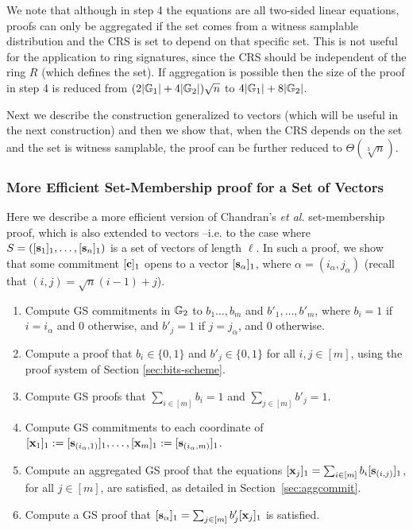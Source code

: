 We note that although in step 4 the equations are all two-sided linear equations, proofs can only be aggregated if the set comes from a witness samplable distribution and the CRS is set to depend on that specific set. 
This is not useful for the application 
to ring signatures, since the CRS should be independent of the ring $R$ (which defines the set). If aggregation is possible then the size of the proof in step 4 is reduced from $(2|\mathbb{G}_1|+4|\mathbb{G}_2|)\sqrt{n}$ to $4|\mathbb{G}_1|+8|\mathbb{G}_2|$.

Next we describe the construction generalized to vectors (which will be useful in the next construction) and then we show that,
when the CRS depends on the set and the set is witness samplable, the proof can be further reduced to $\Theta(\sqrt[3]{n})$.

\subsubsection{More Efficient Set-Membership proof for a Set of Vectors}  
Here we describe a more efficient version of Chandran's \textit{et al.} set-membership proof,  
which is also extended to vectors --i.e. to the case where $S=([\mathbf{s}_1]_1,\ldots,[\mathbf{s}_n]_1)$ is a set of vectors of length $\ell$. In such a proof, we show that some commitment $[\mathbf{c}]_1$ opens to a vector $[\mathbf{s}_{\alpha}]_1$, where $\alpha=(i_\alpha,j_\alpha)$ (recall that $(i,j)=\sqrt{n}(i-1)+j$).

\begin{enumerate}
\item Compute GS commitments in $\mathbb{G}_2$ to $b_1\ldots,b_m$ and $b'_1,\ldots,b'_m$,
      where $b_i = 1$ if $i=i_\alpha$ and $0$ otherwise, and $b'_{j}=1$ if $j=j_\alpha$, and $0$ otherwise.
\item Compute a proof that $b_i \in \{0,1\}$ and $b'_j \in \{0,1\}$ for all $i,j\in[m]$, using the proof system of Section \ref{sec:bits-scheme}.
\item Compute GS proofs that $\sum_{i\in[m]}b_i=1$ and $\sum_{j\in[m]}b'_j=1$. 
\item Compute GS commitments to each coordinate of $[\mathbf{x}_1]_1:=[\mathbf{s}_{(i_\alpha,1)}]_1,\ldots,\allowbreak[\mathbf{x}_m]_1:=[\mathbf{s}_{(i_\alpha,m)}]_1$.
\item Compute an aggregated GS proof that the equations $[\mathbf{x}_j]_1 = \sum_{i\in[m]}b_i[\mathbf{s}_{(i,j)}]_1$, for all $j\in[m]$, are satisfied, as detailed in Section~\ref{sec:aggcommit}.
\item Compute a GS proof that $[\mathbf{s}_{\alpha}]_1 = \sum_{j\in[m]}b'_j[\mathbf{x}_j]_1$ is satisfied.
\end{enumerate}

